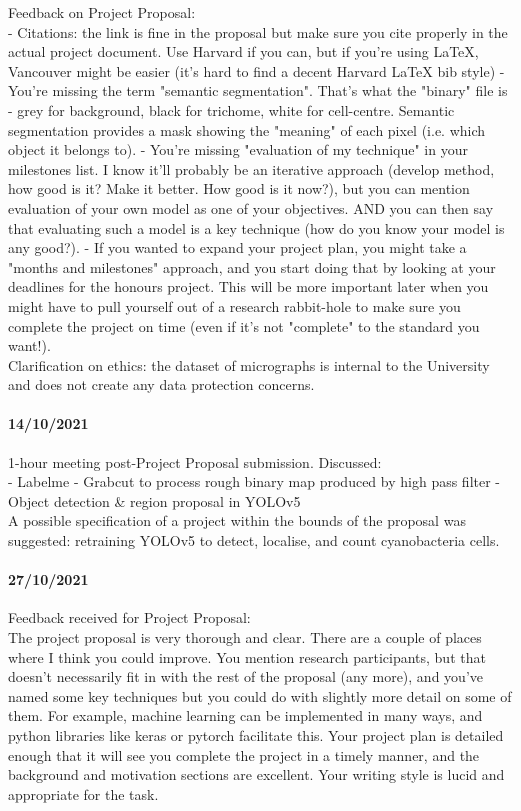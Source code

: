 \begin{appendices}
Feedback on Project Proposal:\\
- Citations: the link is fine in the proposal but make sure you cite properly in the actual project document. Use Harvard if you can, but if you're using LaTeX, Vancouver might be easier (it's hard to find a decent Harvard LaTeX bib style)
- You're missing the term "semantic segmentation". That's what the "binary" file is - grey for background, black for trichome, white for cell-centre. Semantic segmentation provides a mask showing the "meaning" of each pixel (i.e. which object it belongs to).
- You're missing "evaluation of my technique" in your milestones list. I know it'll probably be an iterative approach (develop method, how good is it? Make it better. How good is it now?), but you can mention evaluation of your own model as one of your objectives. AND you can then say that evaluating such a model is a key technique (how do you know your model is any good?).
- If you wanted to expand your project plan, you might take a "months and milestones" approach, and you start doing that by looking at your deadlines for the honours project. This will be more important later when you might have to pull yourself out of a research rabbit-hole to make sure you complete the project on time (even if it's not "complete" to the standard you want!).\\

Clarification on ethics: the dataset of micrographs is internal to the University and does not create any data protection concerns.

\paragraph{14/10/2021}
1-hour meeting post-Project Proposal submission. Discussed:\\
- Labelme
- Grabcut to process rough binary map produced by high pass filter
- Object detection & region proposal in YOLOv5\\

A possible specification of a project within the bounds of the proposal was suggested: retraining YOLOv5 to detect, localise, and count cyanobacteria cells.

\paragraph{27/10/2021}
Feedback received for Project Proposal:\\

The project proposal is very thorough and clear. There are a couple of places where I think you could improve. You mention research participants, but that doesn’t necessarily fit in with the rest of the proposal (any more), and you’ve named some key techniques but you could do with slightly more detail on some of them. For example, machine learning can be implemented in many ways, and python libraries like keras or pytorch facilitate this. Your project plan is detailed enough that it will see you complete the project in a timely manner, and the background and motivation sections are excellent. Your writing style is lucid and appropriate for the task.


\end{appendices}
